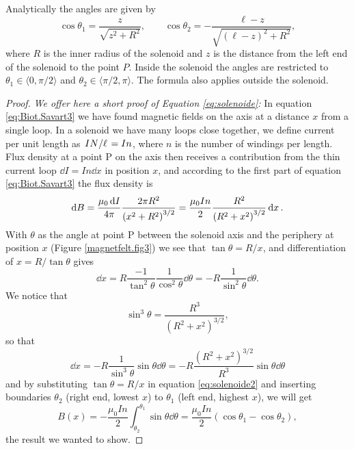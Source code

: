 \documentclass[../Elmag-labhefte-2020.tex]{subfiles}
\begin{document}
%
Analytically the angles are given by
\begin{equation}
    \cos \theta_1 = \frac{z}{\sqrt{z^2 + R^2}}, \qquad
    \cos \theta_2 = - \frac{\ell - z}{\sqrt{(\ell - z)^2 + R^2}},
\end{equation}
where $R$ is the inner radius of the solenoid and $z$ is the distance from the left end of the solenoid to the point $P$. Inside the solenoid the angles are restricted to $\theta_1 \in \langle 0, \pi/2 \rangle$ and $\theta_2 \in \langle \pi/2, \pi \rangle$. The formula also applies outside the solenoid.
%

\begin{proof}
  \emph{We offer here a short proof of Equation \eqref{eq:solenoide}:} In equation \eqref{eq:Biot.Savart3} we have found magnetic fields on the axis at a distance $x$ from a single loop. In a solenoid we have many loops close together, we define current per unit length as $\flatfrac{I N}{\ell} = I n$, where $n$ is the number of windings per length. Flux density at a point P on the axis then receives a contribution from the thin current loop $\dd{I} = I n \dd{x}$ in position $x$, and according to the first part of equation \eqref{eq:Biot.Savart3} the flux density is 
  \begin{equation}
    \dd B 
    = \frac{\mu_0 \dd{I}}{4 \pi} \frac{2\pi R^2}{\qty(x^2 + R^2)^{3/2}}
    = \frac{\mu_0 I n}{2}  \frac{R^2}{ \qty( R^2 + x^2)^{3/2}} \dd{x} .
    \label{eq:solenoide2}
  \end{equation}
  With $\theta$ as the angle at point P between the solenoid axis and the periphery at position $x$ (Figure \ref{magnetfelt.fig3}) we see that $\tan \theta = R / x$, and differentiation of $x = R / \tan \theta$ gives
  \begin{equation}
    \dd{x} 
    = R \frac{-1}{\tan^2 \theta} \frac{1}{\cos^2\theta} \dd{\theta} 
    = -R \frac{1}{\sin^2\theta} \dd{\theta} .
  \end{equation}
  We notice that
  \begin{equation}
    \sin^3 \theta = \frac{R^3}{(R^2 + x^2)^{3/2}},
  \end{equation}
  so that
  \begin{equation}
    \dd{x} 
    = -R \frac{1}{\sin^3\theta} \sin\theta \dd{\theta}
    = -R \frac{(R^2 + x^2)^{3/2}}{R^3} \sin\theta \dd{\theta}
  \end{equation}
  and by substituting $\tan \theta = R / x$ in equation \eqref{eq:solenoide2} and inserting boundaries $\theta_2$ (right end, lowest $x$) to $\theta_1$ (left end, highest $x$), we will get
  \begin{equation}
    B(x) 
    = -\frac{\mu_0 I n}{2} \int_{\theta_2}^{\theta_1} \sin \theta \dd{\theta}
    = \frac{\mu_0 I n}{2} (\cos \theta_1 - \cos \theta_2),
    \label{eq:solenoide3}
  \end{equation}
  the result we wanted to show.
\end{proof}
\end{document}
